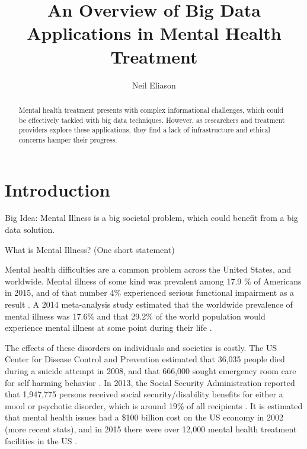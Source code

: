 \documentclass[sigconf]{acmart}
\begin{document}
\title{An Overview of Big Data Applications in Mental Health Treatment}


\author{Neil Eliason}


\renewcommand{\shortauthors}{Eliason}


\begin{abstract}
Mental health treatment presents with complex informational challenges, which could be effectively tackled with big data techniques. However, as researchers and treatment providers explore these applications, they find a lack of infrastructure and ethical concerns hamper their progress.

\end{abstract}



\maketitle

\section{Introduction}
Big Idea: Mental Illness is a big societal problem, which could benefit from a big data solution.

What is Mental Illness? (One short statement)

Mental health difficulties are a common problem across the United States, and worldwide. Mental illness of some kind was prevalent among 17.9 \% of Americans in 2015, and of that number 4\% experienced serious functional impairment as a result \cite{nihmstats}. A 2014 meta-analysis study estimated that the worldwide prevalence of mental illness was 17.6\% and that 29.2\% of the world population would experience mental illness at some point during their life \cite{worldprev}.  

The effects of these disorders on individuals and societies is costly. The US Center for Disease Control and Prevention estimated that 36,035 people died during a suicide attempt in 2008, and that 666,000 sought emergency room care for self harming behavior \cite{cdcsuicide}. In 2013, the Social Security Administration reported that 1,947,775 persons received social security/disability benefits for either a mood or psychotic disorder, which is around 19\% of all recipients \cite{ssarecipients}. 
It is estimated that mental health issues had a \$100 billion cost on the US economy in 2002 \cite{nihmstats} (more recent stats), and in 2015 there were over 12,000 mental health treatment facilities in the US \cite{n-mhss2015}.
\end{document}
